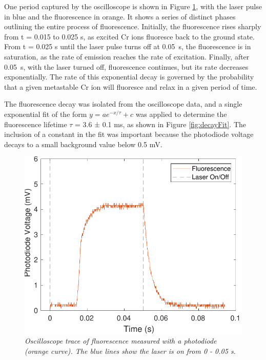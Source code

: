 \documentclass[11pt, a4paper, twocolumn]{article}
\begin{document}
One period captured by the oscilloscope is shown in Figure \ref{fig:fluorescencePeriod}, with the laser pulse in blue and the fluorescence in orange. It shows a series of distinct phases outlining the entire process of fluorescence. Initially, the fluorescence rises sharply from t = 0.015 to 0.025 s, as excited Cr ions fluoresce back to the ground state. From t = 0.025 s until the laser pulse turns off at \SI{0.05}{\s}, the fluorescence is in saturation, as the rate of emission reaches the rate of excitation. Finally, after \SI{0.05}{\s}, with the laser turned off, fluorescence continues, but its rate decreases exponentially. The rate of this exponential decay is governed by the probability that a given metastable Cr ion will fluoresce and relax in a given period of time. 

The fluorescence decay was isolated from the oscilloscope data, and a single exponential fit of the form $y = ae^{-x/\tau} + c$ was applied to determine the fluorescence lifetime $\tau$ = 3.6 ± 0.1 ms, as shown in Figure \ref{fig:decayFit}. The inclusion of a constant in the fit was important because the photodiode voltage decays to a small background value below 0.5 mV.

\begin{figure} [t]
\includegraphics[width=\linewidth]{fluorescencePeriod.pdf}
\caption{\textit{Oscilloscope trace of fluorescence measured with a photodiode (orange curve). The blue lines show the laser is on from 0 - 0.05 s.}}
\label{fig:fluorescencePeriod}
\end{figure}
\end{document}
